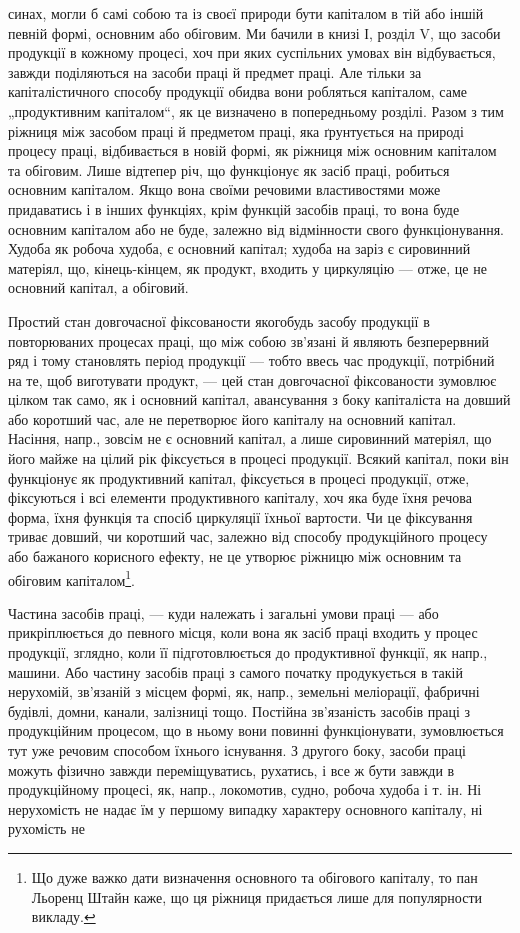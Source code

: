синах, могли б самі собою та із своєї природи бути капіталом в
тій або іншій певній формі, основним або обіговим. Ми бачили в книзі
І, розділ V, що засоби продукції в кожному процесі, хоч при яких суспільних
умовах він відбувається, завжди поділяються на засоби праці й
предмет праці. Але тільки за капіталістичного способу продукції обидва
вони робляться капіталом, саме „продуктивним капіталом“, як це
визначено в попередньому розділі. Разом з тим ріжниця між засобом
праці й предметом праці, яка ґрунтується на природі процесу праці,
відбивається в новій формі, як ріжниця між основним капіталом та обіговим.
Лише відтепер річ, що функціонує як засіб праці, робиться основним
капіталом. Якщо вона своїми речовими властивостями може придаватись
і в інших функціях, крім функцій засобів праці, то вона буде
основним капіталом або не буде, залежно від відмінности свого функціонування.
Худоба як робоча худоба, є основний капітал; худоба на заріз
є сировинний матеріял, що, кінець-кінцем, як продукт, входить у
циркуляцію — отже, це не основний капітал, а обіговий.

Простий стан довгочасної фіксованости якогобудь засобу продукції
в повторюваних процесах праці, що між собою зв’язані й являють
безперервний ряд і тому становлять період продукції — тобто ввесь час
продукції, потрібний на те, щоб виготувати продукт, — цей стан довгочасної
фіксованости зумовлює цілком так само, як і основний капітал,
авансування з боку капіталіста на довший або коротший час, але не
перетворює його капіталу на основний капітал. Насіння, напр., зовсім не
є основний капітал, а лише сировинний матеріял, що його майже на
цілий рік фіксується в процесі продукції. Всякий капітал, поки він функціонує
як продуктивний капітал, фіксується в процесі продукції, отже,
фіксуються і всі елементи продуктивного капіталу, хоч яка буде їхня речова
форма, їхня функція та спосіб циркуляції їхньої вартости. Чи це фіксування
триває довший, чи коротший час, залежно від способу продукційного
процесу або бажаного корисного ефекту, не це утворює ріжницю між
основним та обіговим капіталом\footnote{
Що дуже важко дати визначення основного та обігового капіталу, то пан
Льоренц Штайн каже, що ця ріжниця придається лише для популярности викладу.
}.

Частина засобів праці, — куди належать і загальні умови праці — або
прикріплюється до певного місця, коли вона як засіб праці входить у процес
продукції, зглядно, коли її підготовлюється до продуктивної функції, як
напр., машини. Або частину засобів праці з самого початку продукується
в такій нерухомій, зв’язаній з місцем формі, як, напр., земельні
меліорації, фабричні будівлі, домни, канали, залізниці тощо. Постійна
зв’язаність засобів праці з продукційним процесом, що в ньому вони
повинні функціонувати, зумовлюється тут уже речовим способом їхнього
існування. З другого боку, засоби праці можуть фізично завжди переміщуватись,
рухатись, і все ж бути завжди в продукційному процесі, як,
напр., локомотив, судно, робоча худоба і т. ін. Ні нерухомість не надає
їм у першому випадку характеру основного капіталу, ні рухомість не
